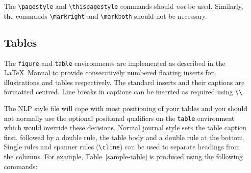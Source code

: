 \documentclass{CUP-JNL-NLP}
\begin{document}
The \verb"\pagestyle" and \verb"\thispagestyle" commands should {\em not\/} be
used.
Similarly, the commands \verb"\markright" and \verb"\markboth" should not be
necessary.


\subsection{Tables}

The {\tt figure} and {\tt table} environments are implemented as described in
the \LaTeX\ Manual to
provide consecutively numbered floating inserts for illustrations and tables
respectively.
The standard inserts and their captions are formatted centred.
Line breaks in captions can be inserted as required using \verb"\\".

The NLP style file will cope with most positioning of your tables
and you should not normally use the optional positional qualifiers on the
\verb"table" environment which would override these decisions.
Normal journal style sets the table caption first, followed by a double
rule, the table body and a double rule at the bottom.  Single rules and
spanner rules (\verb"\cline") can be used to separate headings from the
columns.  For example, Table~\ref{sample-table} is produced using the
following commands:\par
%
\end{document}

